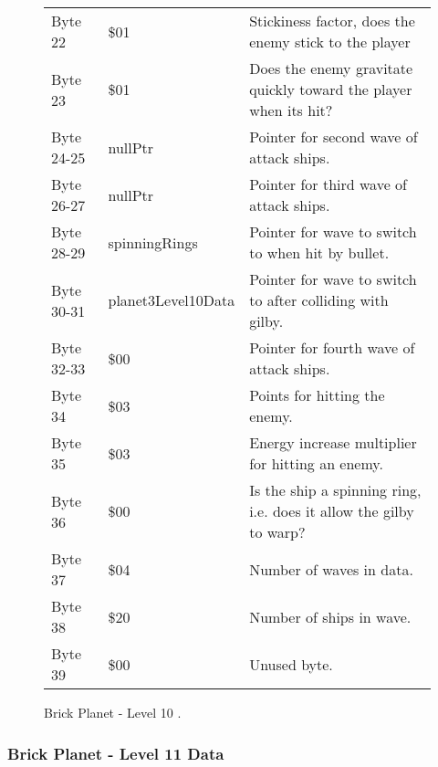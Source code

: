 \begin{figure}[H]
{\begin{adjustbox}{width=12cm}
\begin{tabular}{lll}
 Byte 22    & \$01                        & Stickiness factor, does the enemy stick to the player               \\
 Byte 23    & \$01                        & Does the enemy gravitate quickly toward the player when its hit?    \\
 Byte 24-25 & nullPtr                    & Pointer for second wave of attack ships.                            \\
 Byte 26-27 & nullPtr                    & Pointer for third wave of attack ships.                             \\
 Byte 28-29 & spinningRings              & Pointer for wave to switch to when hit by bullet.                   \\
 Byte 30-31 & planet3Level10Data         & Pointer for  wave to switch to after colliding with gilby.          \\
 Byte 32-33 & \$00                        & Pointer for fourth wave of attack ships.                            \\
 Byte 34    & \$03                        & Points for hitting the enemy.                                       \\
 Byte 35    & \$03                        & Energy increase multiplier for hitting an enemy.                    \\
 Byte 36    & \$00                        & Is the ship a spinning ring, i.e. does it allow the gilby to warp?  \\
 Byte 37    & \$04                        & Number of waves in data.                                            \\
 Byte 38    & \$20                        & Number of ships in wave.                                            \\
 Byte 39    & \$00                        & Unused byte.                                                        \\
\bottomrule
\end{tabular}

  \end{adjustbox}

  }\caption*{Brick Planet - Level 10
.}
\end{figure}

\clearpage
\subsubsection{Brick Planet - Level 11 Data}

